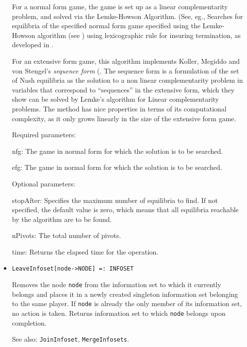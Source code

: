 \begin{itemize}
\bd
For a normal form game, the game is set up as a linear
complementarity problem, and solved via the Lemke-Howson Algorithm.
(See, eg., Searches for equilibria of the specified normal form game
specified using the Lemke-Howson algorithm (see
\cite[1964]{LemHow:64}) using lexicographic rule for insuring
termination, as developed in \cite[1971]{Eav:71}.

For an extensive form game, this algorithm implements Koller, Megiddo
and von Stengel's {\em sequence form} (\cite[1994]{KolMegSte:94}. The
sequence form is a formulation of the set of Nash equilibria as the
solution to a non linear complementarity problem in variables that
correspond to ``sequences'' in the extensive form, which they show can
be solved by Lemke's algorithm for Linear complementarity problems.
The method has nice properties in terms of its computational
complexity, as it only grows linearly in the size of the extensive
form game.  

\item
[Required parameters:]\hfil\null

\bd
\item
[nfg:] The game in normal form for which the solution is to be
searched.
\item
[efg:] The game in normal form for which the solution is to be
searched.
\ed

\item
[Optional parameters:]\hfil\null

\bd
\item
[stopAfter:] Specifies the maximum number of equilibria to find.  If
not specified, the default value is zero, which means that all
equilibria reachable by the algorithm are to be found.
\item
[nPivots:] The total number of pivots. 
\item
[time:] Returns the elapsed time for the operation.
\ed
\ed

\item
\protect \large \begin{verbatim}
LeaveInfoset[node->NODE] =: INFOSET
\end{verbatim}\normalsize

\bd
Removes the node \verb+node+ from the information set to
which it currently belongs and places it in a newly created
singleton information set belonging to the same player.  If \verb+node+
is already the only member of its information set, no action is taken.
Returns information set to which \verb+node+ belongs upon completion.
\item
[See also:] {\tt JoinInfoset}, {\tt MergeInfosets}.
\ed


\end{itemize}
